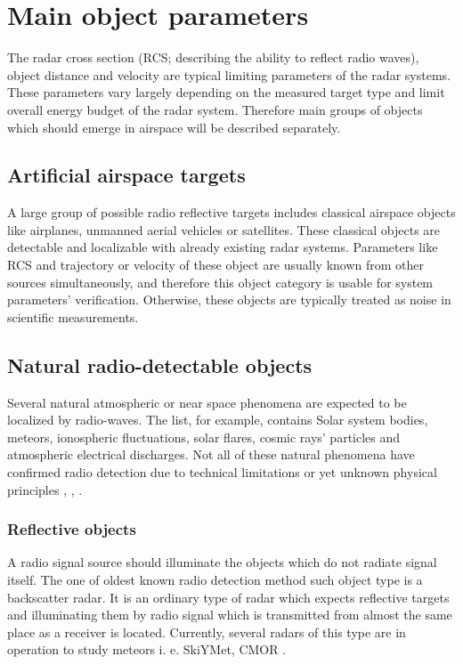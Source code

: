 \documentclass[twoside]{ctuthesis}
\theoremstyle{plain}
\theoremstyle{definition}
\theoremstyle{note}
\begin{document}
\section{Main object parameters}

The radar cross section (RCS; describing the ability to reflect radio waves), object distance and velocity are typical limiting parameters of the radar systems. These parameters vary largely depending on the measured target type and limit overall energy budget of the radar system. Therefore main groups of objects which should emerge in airspace will be described separately. 

\subsection{Artificial airspace targets}

A large group of possible radio reflective targets includes classical airspace objects like airplanes, unmanned aerial vehicles or satellites. These classical objects are detectable and localizable with already existing radar systems. Parameters like RCS and trajectory or velocity of these object are usually known from other sources simultaneously, and therefore this object category is usable for system parameters' verification. Otherwise, these objects are typically treated as noise in scientific measurements. 

\subsection{Natural radio-detectable objects}

Several natural atmospheric or near space phenomena are expected to be localized by radio-waves. The list, for example, contains Solar system bodies, meteors, ionospheric fluctuations, solar flares, cosmic rays' particles and atmospheric electrical discharges. Not all of these natural phenomena have confirmed radio detection due to technical limitations or yet unknown physical principles \cite{LOPES}, \cite{astro_particles}, \cite{LOFAR_showers}.

\subsubsection{Reflective objects}
A radio signal source should illuminate the objects which do not radiate signal itself. 
The one of oldest known radio detection method such object type is a backscatter radar. It is an ordinary type of radar which expects reflective targets and illuminating them by radio signal which is transmitted from almost the same place as a receiver is located. Currently, several radars of this type are in operation to study meteors i. e.  SkiYMet\cite{skiymet}, CMOR \cite{CMOR_radar}.
\end{document}
